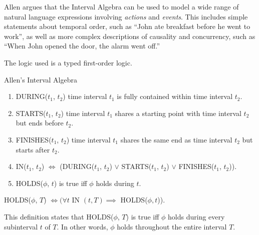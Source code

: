 Allen argues that the Interval Algebra can be used to model a wide range of natural language expressions involving \textit{actions} and \textit{events}. This includes simple statements about temporal order, such as ``John ate breakfast before he went to work'', as well as more complex descriptions of causality and concurrency, such as ``When John opened the door, the alarm went off.''


\pagebreak
The logic used is a typed first-order logic.

\begin{exmp} Allen's Interval Algebra

	\begin{enumerate}
		\item DURING($t_1$, $t_2$) time interval $t_1$ is fully contained within time interval $t_2$.

		\item STARTS($t_1$, $t_2$) time interval $t_1$ shares a starting point with time interval $t_2$ but ends before $t_2$.

		\item FINISHES($t_1$, $t_2$) time interval $t_1$ shares the same end as time interval $t_2$ but starts after $t_2$.

		\item IN($t_1$, $t_2$) $\iff$ (DURING($t_1$, $t_2$) $\lor$ STARTS($t_1$, $t_2$) $\lor$ FINISHES($t_1$, $t_2$)).

		\item HOLDS(\(\phi\), \(t\)) is true iff \(\phi\) holds during \(t\).
	\end{enumerate}



	\begin{center}
		HOLDS(\(\phi\), \(T\)) \(\iff ( \forall t \) IN $ (t,T) \implies $ HOLDS($\phi, t$)).
	\end{center}

	This definition states that HOLDS($\phi$, $T$) is true iff $\phi$ holds during every subinterval $t$ of $T$. In other words, $\phi$ holds throughout the entire interval $T$.
\end{exmp}

